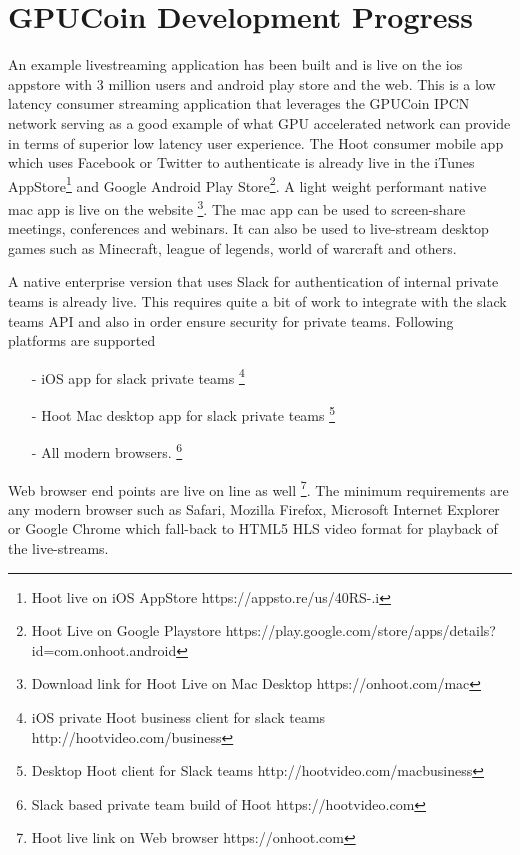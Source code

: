 \documentclass{article}
\begin{document}




\section{GPUCoin Development Progress}

An example livestreaming application has been built and is live on the ios appstore with 3 million users and android play store and the web. This is a low latency consumer streaming application that leverages the GPUCoin IPCN network serving as a good example of what GPU accelerated network can provide in terms of superior low latency user experience.
The Hoot consumer mobile app which uses Facebook or Twitter to authenticate is already live in the iTunes AppStore\footnote{Hoot live on iOS AppStore https://appsto.re/us/40RS-.i} and Google Android Play Store\footnote{Hoot Live on Google Playstore https://play.google.com/store/apps/details?id=com.onhoot.android}.
A light weight performant native mac app is live on
the website \footnote{Download link for Hoot Live on Mac Desktop https://onhoot.com/mac}. The mac app can be used to screen-share meetings, conferences and webinars. It can also be used to live-stream desktop games such as Minecraft, league of legends, world of warcraft and others.

A native enterprise version that uses Slack for authentication of internal private teams is already live.
 This requires quite a bit of work to integrate with the slack teams API and also in order ensure security for private teams. Following platforms are supported
\begin{itemize}

\item[-]iOS app for slack private teams \footnote{ iOS private Hoot business client for slack teams http://hootvideo.com/business}
\item[-]Hoot Mac desktop app for slack private teams \footnote{Desktop Hoot client for Slack teams http://hootvideo.com/macbusiness}
\item[-]All modern browsers. \footnote{Slack based private team build of Hoot https://hootvideo.com}
\end{itemize}

Web browser end points are live on line as well \footnote{Hoot live link on Web browser https://onhoot.com}. The minimum requirements are any modern browser such as Safari, Mozilla Firefox, Microsoft Internet Explorer or Google Chrome which fall-back to HTML5 HLS video format for playback of the live-streams.
\end{document}
